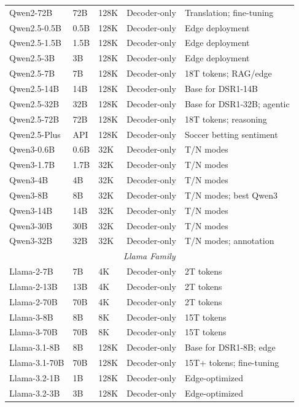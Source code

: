 \begin{longtable}{@{}p{3.5cm}p{1.8cm}p{2cm}p{2.2cm}p{3cm}@{}}
Qwen2-72B & 72B & 128K & Decoder-only & Translation; fine-tuning \\
Qwen2.5-0.5B & 0.5B & 128K & Decoder-only & Edge deployment \\
Qwen2.5-1.5B & 1.5B & 128K & Decoder-only & Edge deployment \\
Qwen2.5-3B & 3B & 128K & Decoder-only & Edge deployment \\
Qwen2.5-7B & 7B & 128K & Decoder-only & 18T tokens; RAG/edge \\
Qwen2.5-14B & 14B & 128K & Decoder-only & Base for DSR1-14B \\
Qwen2.5-32B & 32B & 128K & Decoder-only & Base for DSR1-32B; agentic \\
Qwen2.5-72B & 72B & 128K & Decoder-only & 18T tokens; reasoning \\
Qwen2.5-Plus & API & 128K & Decoder-only & Soccer betting sentiment \\
Qwen3-0.6B & 0.6B & 32K & Decoder-only & T/N modes \\
Qwen3-1.7B & 1.7B & 32K & Decoder-only & T/N modes \\
Qwen3-4B & 4B & 32K & Decoder-only & T/N modes \\
Qwen3-8B & 8B & 32K & Decoder-only & T/N modes; best Qwen3 \\
Qwen3-14B & 14B & 32K & Decoder-only & T/N modes \\
Qwen3-30B & 30B & 32K & Decoder-only & T/N modes \\
Qwen3-32B & 32B & 32K & Decoder-only & T/N modes; annotation \\
\midrule
\multicolumn{5}{c}{\textit{Llama Family}} \\
\midrule
Llama-2-7B & 7B & 4K & Decoder-only & 2T tokens \\
Llama-2-13B & 13B & 4K & Decoder-only & 2T tokens \\
Llama-2-70B & 70B & 4K & Decoder-only & 2T tokens \\
Llama-3-8B & 8B & 8K & Decoder-only & 15T tokens \\
Llama-3-70B & 70B & 8K & Decoder-only & 15T tokens \\
Llama-3.1-8B & 8B & 128K & Decoder-only & Base for DSR1-8B; edge \\
Llama-3.1-70B & 70B & 128K & Decoder-only & 15T+ tokens; fine-tuning \\
Llama-3.2-1B & 1B & 128K & Decoder-only & Edge-optimized \\
Llama-3.2-3B & 3B & 128K & Decoder-only & Edge-optimized \\

\end{longtable}

